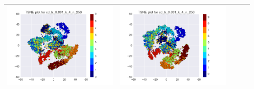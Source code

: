 \documentclass[12pt]{report}
\begin{document}
\begin{table}[H]
\begin{tabular}{ | c | c | c | c || c |}
\begin{minipage}{.3\textwidth}
      \includegraphics[scale=0.25]{cd_lr_0_001_k_4_n_256.png}
    \end{minipage} &
    \begin{minipage}{.3\textwidth}
      \includegraphics[scale=0.25]{test_cd_lr_0_001_k_4_n_256.png}
    \end{minipage}
        \\ \hline
  \end{tabular}
\end{table}
\end{document}
